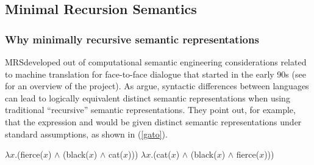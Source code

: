 \documentclass[output=paper,biblatex,babelshorthands,newtxmath,draftmode,colorlinks,citecolor=brown]{langscibook}
\begin{document}
\subsection{Minimal Recursion Semantics}
\label{sec-minimal-recursion-semantics}\label{semantics:sec-mrs}

\subsubsection{Why minimally recursive semantic representations}

MRS\indexmrsstart developed out of computational semantic engineering considerations related to machine translation for face-to-face dialogue that started in the early 90s (see \citealt{Kayetal1992} for an overview of the \verbmobil project). As \citet{Copestakeetal1995} argue, syntactic differences between languages can lead to logically equivalent distinct semantic representations when using traditional ``recursive'' semantic representations. They point out, for example, that the  expression  and   would be given distinct semantic representations under standard assumptions, as shown in (\ref{gato}).

\begin{exe}
\ex\label{gato}
\begin{xlist}
\ex\label{gatoa}
$\lambda x$.(fierce($x$) $\wedge$ (black($x$) $\wedge$ cat($x$)))
\ex\label{gatob}
$\lambda x$.(cat($x$) $\wedge$ (black($x$) $\wedge$ fierce($x$)))
\end{xlist}
\end{exe}
\end{document}
